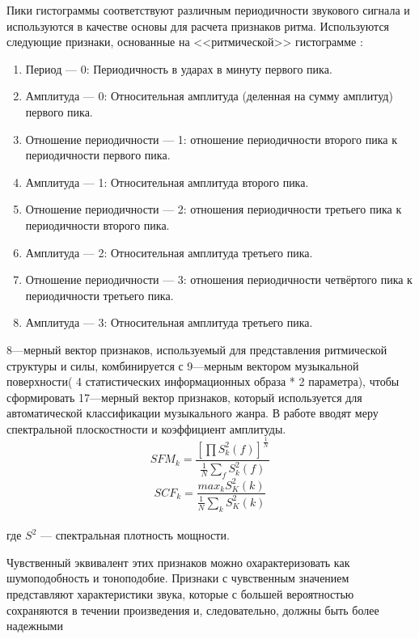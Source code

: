 Пики гистограммы соответствуют различным периодичности звукового сигнала и используются в качестве основы для расчета признаков ритма. Используются следующие признаки, основанные на <<ритмической>> гистограмме :
\begin{enumerate}[label=\arabic*.]
\item Период — 0: Периодичность в ударах в минуту первого пика.
\item Амплитуда — 0: Относительная амплитуда (деленная на сумму амплитуд) первого пика.
\item Отношение периодичности — 1: отношение периодичности второго пика к периодичности первого пика.
\item Амплитуда — 1: Относительная амплитуда второго пика.
\item Отношение периодичности — 2: отношения периодичности третьего пика к периодичности второго пика.
\item Амплитуда — 2: Относительная амплитуда третьего пика.
\item Отношение периодичности — 3: отношения периодичности четвёртого пика к периодичности третьего пика.
\item Амплитуда — 3: Относительная амплитуда третьего пика.
\end{enumerate}

8—мерный вектор признаков, используемый для представления ритмической структуры и силы, комбинируется с 9—мерным вектором музыкальной поверхности( 4 статистических информационных образа * 2 параметра), чтобы сформировать 17—мерный вектор признаков, который используется для автоматической классификации музыкального жанра.
В работе \cite{src2}  вводят меру спектральной плоскостности и коэффициент амплитуды.
\begin{equation}\label{eq:sfm}
SFM_k= \frac{[\prod S^2_k(f)]^{\frac{1}{N}} }{\frac{1}{N} \sum_f S^2_k(f)}	
\end{equation}
\begin{equation}\label{eq:scf}
SCF_k =  \frac{max_k S^2_K(k)}{\frac{1}{N} \sum_k S^2_K(k)}
\end{equation}\\
где $ S^2 $ — спектральная плотность мощности.

Чувственный эквивалент этих признаков можно охарактеризовать как шумоподобность и тоноподобие. Признаки с чувственным значением представляют характеристики звука, которые с большей вероятностью сохраняются в течении произведения и, следовательно, должны быть более надежными 

